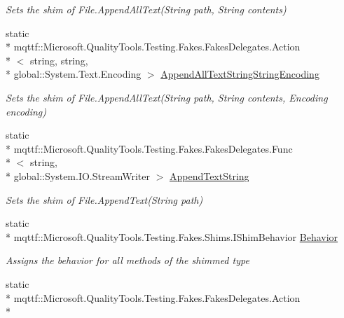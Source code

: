 \begin{DoxyCompactItemize}
\begin{DoxyCompactList}\small\item\em Sets the shim of File.\-Append\-All\-Text(\-String path, String contents)\end{DoxyCompactList}\item 
static \\*
mqttf\-::\-Microsoft.\-Quality\-Tools.\-Testing.\-Fakes.\-Fakes\-Delegates.\-Action\\*
$<$ string, string, \\*
global\-::\-System.\-Text.\-Encoding $>$ \hyperlink{class_system_1_1_i_o_1_1_fakes_1_1_shim_file_aa97941d8669090b0c0c6670d3b81d3c1}{Append\-All\-Text\-String\-String\-Encoding}
\begin{DoxyCompactList}\small\item\em Sets the shim of File.\-Append\-All\-Text(\-String path, String contents, Encoding encoding)\end{DoxyCompactList}\item 
static \\*
mqttf\-::\-Microsoft.\-Quality\-Tools.\-Testing.\-Fakes.\-Fakes\-Delegates.\-Func\\*
$<$ string, \\*
global\-::\-System.\-I\-O.\-Stream\-Writer $>$ \hyperlink{class_system_1_1_i_o_1_1_fakes_1_1_shim_file_ad96462ccb8941464b61125a3e6823386}{Append\-Text\-String}
\begin{DoxyCompactList}\small\item\em Sets the shim of File.\-Append\-Text(\-String path)\end{DoxyCompactList}\item 
static \\*
mqttf\-::\-Microsoft.\-Quality\-Tools.\-Testing.\-Fakes.\-Shims.\-I\-Shim\-Behavior \hyperlink{class_system_1_1_i_o_1_1_fakes_1_1_shim_file_af5671d00f8e459e6ad7beb52de437973}{Behavior}
\begin{DoxyCompactList}\small\item\em Assigns the behavior for all methods of the shimmed type\end{DoxyCompactList}\item 
static \\*
mqttf\-::\-Microsoft.\-Quality\-Tools.\-Testing.\-Fakes.\-Fakes\-Delegates.\-Action\\*

\end{DoxyCompactItemize}

